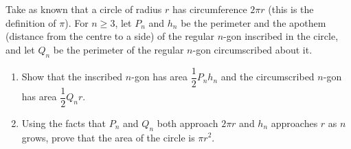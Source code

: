 Take as known that a circle of radius $r$ has circumference $2\pi r$ (this is the definition of $\pi$). For $n\ge3$, let $P_n$ and $h_n$ be the perimeter and the apothem (distance from the centre to a side) of the regular $n$-gon inscribed in the circle, and let $Q_n$ be the perimeter of the regular $n$-gon circumscribed about it.
\begin{enumerate}
\item[(a)] Show that the inscribed $n$-gon has area $\dfrac{1}{2}P_nh_n$ and the circumscribed $n$-gon has area $\dfrac{1}{2}Q_nr$.
\item[(b)] Using the facts that $P_n$ and $Q_n$ both approach $2\pi r$ and $h_n$ approaches $r$ as $n$ grows, prove that the area of the circle is $\pi r^2$.
\end{enumerate}
